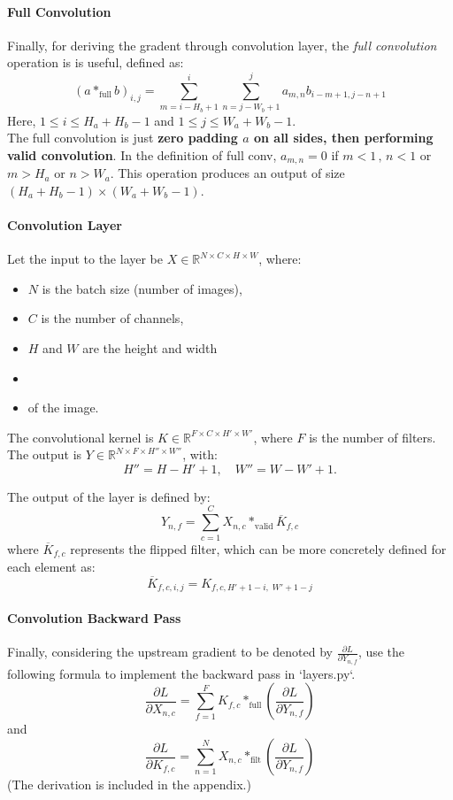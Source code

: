 \documentclass[lang=cn,11pt]{elegantbook}
\begin{document}
\paragraph*{Full Convolution} Finally, for deriving the gradent through convolution layer, the \textit{full convolution} operation is is useful, defined as:
\[
(a *_{\text{full}} b)_{i,j} =
\sum_{m=i-H_b+1}^{i} \sum_{n=j-W_b+1}^{j} a_{m,n} b_{i-m+1, j-n+1}
\]
Here, $1 \leq i \leq H_a + H_b - 1$ and $1 \leq j \leq W_a + W_b - 1$.\\
The full convolution is just \textbf{zero padding $a$ on all sides, then performing valid convolution}.
In the definition of full conv, $a_{m,n} = 0$ if $m<1\,,\, n<1$ or $m>H_a$ or $n>W_a$.
This operation produces an output of size $(H_a + H_b  -1 )\times (W_a + W_b -1)$.


\paragraph*{Convolution Layer}
Let the input to the layer be $X \in \mathbb{R}^{N \times C \times H \times W}$, where:
\begin{itemize}
    \item $N$ is the batch size (number of images),
    \item $C$ is the number of channels,
    \item $H$ and $W$ are the height and width 
    \item 
    \item of the image.
\end{itemize}

The convolutional kernel is $K \in \mathbb{R}^{F \times C \times H' \times W'}$, where $F$ is the number of filters.\\

The output is $Y \in \mathbb{R}^{N \times F \times H'' \times W''}$, with:
\[
H'' = H - H' + 1, \quad W'' = W - W' + 1.
\]

The output of the layer is defined by:
\[
Y_{n,f} = \sum_{c=1}^{C} X_{n,c} *_{\text{valid}} \overline{K}_{f,c}
\]
where $\overline{K}_{f,c}$ represents the flipped filter, which can be more concretely defined for each element as:
\[\overline{K}_{f,c,i,j} = K_{f,c,H' + 1 - i,\; W' + 1 - j}
\]

\paragraph*{Convolution Backward Pass}
Finally, considering the upstream gradient to be denoted by $\frac{\partial L}{\partial Y_{n,f}}$, use the following formula to implement the backward pass in `layers.py`. \[
\frac{\partial L}{\partial X_{n,c}} = \sum_{f=1}^{F} K_{f,c} *_{\text{full}} \left( \frac{\partial L}{\partial Y_{n,f}} \right)
\]
and  \[
\frac{\partial L}{\partial K_{f,c}} = \sum_{n=1}^{N} X_{n,c} *_{\text{filt}} \left( \frac{\partial L}{\partial Y_{n,f}} \right)
\]
(The derivation is included in the appendix.)
\end{document}
